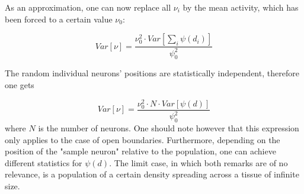 \documentclass[10pt,a4paper]{article}
\begin{document}
As an approximation, one can now replace all $\nu_i$ by the mean activity, which has been forced to a certain value $\nu_0$:

\begin{equation}
Var[\nu] = \frac{\nu_0^2 \cdot Var[\sum \limits_{i} \psi(d_i)]}{\psi_0^2}
\label{variance_sample_neuron_firing_rate_mean_act}
\end{equation}

The random individual neurons' positions are statistically independent, therefore one gets

\begin{equation}
Var[\nu] = \frac{\nu_0^2 \cdot N \cdot Var[\psi(d)]}{\psi_0^2}
\label{variance_sample_neuron_firing_rate_mean_act_indep_positions}
\end{equation}
where $N$ is the number of neurons. One should note however that this expression only applies to the case of open boundaries. Furthermore, depending on the position of the "sample neuron" relative to the population, one can achieve different statistics for $\psi(d)$. The limit case, in which both remarks are of no relevance, is a population of a certain density spreading across a tissue of infinite size.




\end{document}
